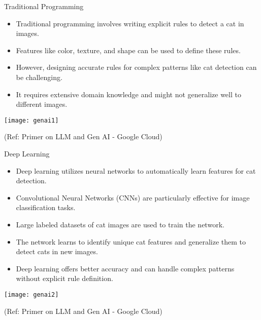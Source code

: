 \begin{frame}[fragile]{Traditional Programming}
  \begin{itemize}
    \item Traditional programming involves writing explicit rules to detect a cat in images.
    \item Features like color, texture, and shape can be used to define these rules.
    \item However, designing accurate rules for complex patterns like cat detection can be challenging.
    \item It requires extensive domain knowledge and might not generalize well to different images.
  \end{itemize}
  
\begin{center}
\texttt{[image: genai1]}
\end{center}

{\tiny (Ref: Primer on LLM and Gen AI - Google Cloud)}
  
\end{frame}

\begin{frame}[fragile]{Deep Learning}
  \begin{itemize}
    \item Deep learning utilizes neural networks to automatically learn features for cat detection.
    \item Convolutional Neural Networks (CNNs) are particularly effective for image classification tasks.
    \item Large labeled datasets of cat images are used to train the network.
    \item The network learns to identify unique cat features and generalize them to detect cats in new images.
    \item Deep learning offers better accuracy and can handle complex patterns without explicit rule definition.
  \end{itemize}
  
\begin{center}
\texttt{[image: genai2]}
\end{center}

{\tiny (Ref: Primer on LLM and Gen AI - Google Cloud)}  
\end{frame}


